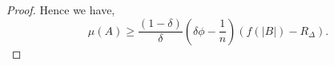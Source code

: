 \documentclass[twocolumn]{article}[10pt]
\newcommand{\floor}[1]{\left\lfloor #1 \right\rfloor}
\newcommand{\ceil}[1]{\left\lceil #1 \right\rceil}
\newcommand{\paren}[1]{\left( #1 \right)}
\begin{document}
\begin{proof}
  Hence we have, 
  \begin{equation}
    \label{eq:nastyobliviousamplificationlemmastep1backlog}
  \mu(A) \ge
  \frac{(1-\delta)}{\delta}\paren{\delta\phi-\frac{1}{n}}(f(|B|)-R_\Delta).
  \end{equation}







\end{proof}
\end{document}
